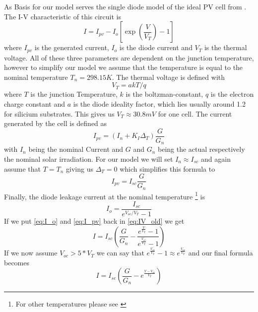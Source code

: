 As Basis for our model serves the single diode model of  the  ideal PV cell from
\cite{ref:villa:pvmodel}  . The I-V characteristic of
this circuit is
\begin{equation} \label{eq:IV_old}
 I = I_{pv} - I_o \left[ \exp \left( \frac{V}{V_T} \right) - 1 \right]
\end{equation}
where $I_{pv}$ is the generated current, $I_o$ is the diode current and $V_T$ is
the thermal voltage. All of these three parameters are dependent on the junction
temperature, however to simplify our model  we  assume  that  the temperature is
equal to the nominal temperature $T_n = 298.15K$. The thermal voltage is defined
with
\begin{equation}
    V_T = a k T / q
\end{equation}
where $T$ is the junction Temperature,  $k$ is the boltzman-constant, $q$ is the
electron charge constant and $a$  is  the  diode  ideality  factor,  which  lies
usually around 1.2 for silicium substrates. This  gives  us $V_T \approx 30.8mV$
for one cell. The current generated by the cell is defined as
\begin{equation}
    I_{pv} = \left( I_n + K_I \Delta_T \right) \frac{G}{G_n}
\end{equation}
with  $I_n$  being  the  nominal  Current  and  $G$  and $G_n$ being the  actual
respectively  the nominal solar irradiation. For our  model  we  will  set  $I_n
\approx I_{sc}$ and again assume that $T  =  T_n$ giving us $\Delta_T = 0$ which
simplifies this formula to
\begin{equation} \label{eq:I_pv}
    I_{pv} = I_{sc} \frac{G}{G_n}
\end{equation}
Finally, the  diode  leakage  current  at  the nominal temperature \footnote{For
other temperatures please see \cite{ref:villa:pvmodel}} is
\begin{equation} \label{eq:I_o}
    I_o = \frac{I_{sc}}{e^{V_{oc} / V_T} - 1}
\end{equation}
If we put \eqref{eq:I_o} and \eqref{eq:I_pv}  back  in  \eqref{eq:IV_old} we get
\begin{equation}
    I = I_{sc} \left( \frac{G}{G_n} - \frac{e^{\frac{V}{V_T}}-1}{e^{\frac{V_{oc}}{V_T}}-1} \right)
\end{equation}
If we now assume $V_{oc} >  5  *  V_T$ we can say that $e^{\frac{V_{oc}}{V_T}}-1
\approx e^{\frac{V_{oc}}{V_T}}$ and our final formula becomes
\begin{equation} \label{eq:IV}
    I = I_{sc} \left( \frac{G}{G_n} - e^{\frac{V - V_{oc}}{V_T}} \right)
\end{equation}


